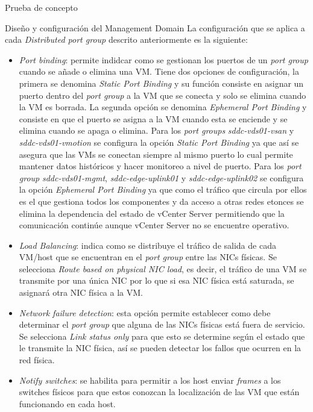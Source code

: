 \begin{section}{Prueba de concepto}
\begin{subsection}{Diseño y configuración del Management Domain}
    La configuración que se aplica a cada \textit{Distributed port group} descrito anteriormente es la siguiente:
    \begin{itemize}
      \item \textit{Port binding}: permite indidcar como se gestionan los puertos de un \textit{port group} cuando se añade o elimina una VM. Tiene dos opciones de configuración, la primera se denomina \textit{Static Port Binding} y su función consiste en asignar un puerto dentro del \textit{port group} a la VM que se conecta y solo se elimina cuando la VM es borrada. La segunda opción se denomina \textit{Ephemeral Port Binding} y consiste en que el puerto se asigna a la VM cuando esta se enciende y se elimina cuando se apaga o elimina. Para los \textit{port groups} \textit{sddc-vds01-vsan} y \textit{sddc-vds01-vmotion} se configura la opción \textit{Static Port Binding} ya que así se asegura que las VMs se conectan siempre al mismo puerto lo cual permite mantener datos históricos y hacer monitoreo a nivel de puerto. Para los \textit{port group} \textit{sddc-vds01-mgmt}, \textit{sddc-edge-uplink01} y \textit{sddc-edge-uplink02} se configura la opción \textit{Ephemeral Port Binding} ya que como el tráfico que circula por ellos es el que gestiona todos los componentes y da acceso a otras redes etonces se elimina la dependencia del estado de vCenter Server permitiendo que la comunicación continúe aunque vCenter Server no se encuentre operativo.
    
      \item \textit{Load Balancing}: indica como se distribuye el tráfico de salida de cada VM/host que se encuentran en el \textit{port group} entre las NICs físicas. Se selecciona \textit{Route based on physical NIC load}, es decir, el tráfico de una VM se transmite por una única NIC por lo que si esa NIC física está saturada, se asignará otra NIC física a la VM.
      
      \item \textit{Network failure detection}: esta opción permite establecer como debe determinar el \textit{port group} que alguna de las NICs físicas está fuera de servicio. Se selecciona \textit{Link status only} para que esto se determine según el estado que le transmite la NIC física, así se pueden detectar los fallos que ocurren en la red física.
      
      \item \textit{Notify switches}: se habilita para permitir a los host enviar \textit{frames} a los switches físicos para que estos conozcan la localización de las VM que están funcionando en cada host.
      

\end{itemize}
\end{subsection}
\end{section}
